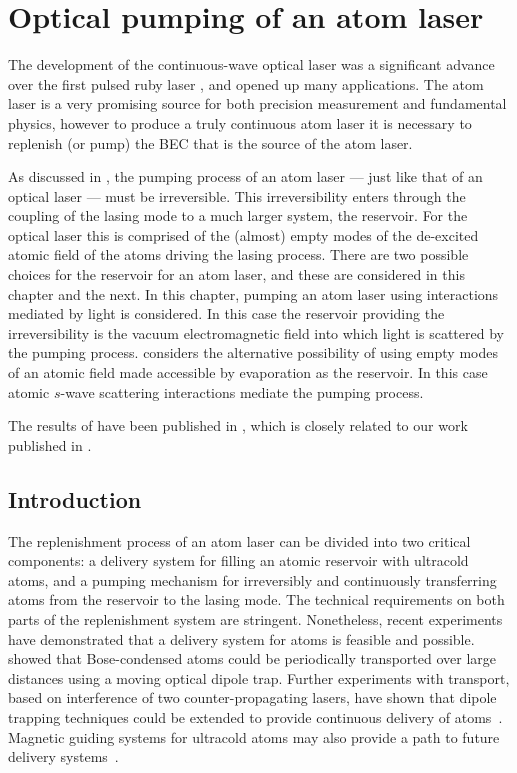 \chapter{Optical pumping of an atom laser}
\label{OpticalPumping}
\graphicspath{{Figures/OpticalPumping/}{Figures/Common/}}

The development of the continuous-wave optical laser \citep{Javan:1961} was a significant advance over the first pulsed ruby laser \citep{Maiman:1960}, and opened up many applications.  The atom laser is a very promising source for both precision measurement and fundamental physics, however to produce a truly continuous atom laser it is necessary to replenish (or pump) the BEC that is the source of the atom laser.

As discussed in , the pumping process of an atom laser --- just like that of an optical laser --- must be irreversible.  This irreversibility enters through the coupling of the lasing mode to a much larger system, the reservoir.  For the optical laser this is comprised of the (almost) empty modes of the de-excited atomic field of the atoms driving the lasing process.  There are two possible choices for the reservoir for an atom laser, and these are considered in this chapter and the next.  In this chapter, pumping an atom laser using interactions mediated by light is considered.  In this case the reservoir providing the irreversibility is the vacuum electromagnetic field into which light is scattered by the pumping process.   considers the alternative possibility of using empty modes of an atomic field made accessible by evaporation as the reservoir.  In this case atomic $s$-wave scattering interactions mediate the pumping process.

The results of  have been published in \citet{Doring:2009}, which is closely related to our work published in \citet{Robins:2008}.

\section{Introduction}

The replenishment process of an atom laser can be divided into two critical components: a delivery system for filling an atomic reservoir with ultracold atoms, and a pumping mechanism for irreversibly and continuously transferring atoms from the reservoir to the lasing mode.  The technical requirements on both parts of the replenishment system are stringent.  Nonetheless, recent experiments have demonstrated that a delivery system for atoms is feasible and possible. \citet{Chikkatur:2002qa} showed that Bose-condensed atoms could be periodically transported over large distances using a moving optical dipole trap.  Further experiments with transport, based on interference of two counter-propagating lasers, have shown that dipole trapping techniques could be extended to provide continuous delivery of atoms~\citep{Schmid:2006}.  Magnetic guiding systems for ultracold atoms may also provide a path to future delivery systems~\citep{Lahaye:2004,Greiner:2001,Greiner:2007}.

